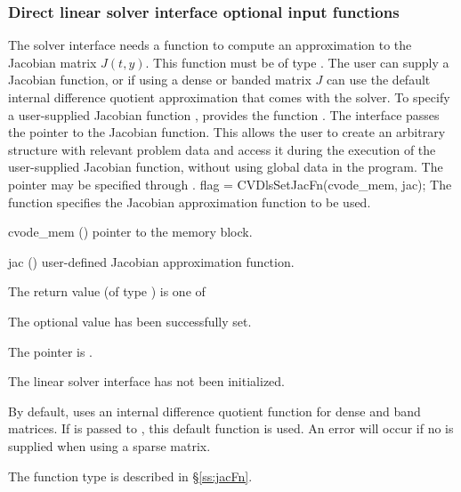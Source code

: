 \subsubsection{Direct linear solver interface optional input functions}
\label{sss:optin_dls}
The 
{\cvdls} solver interface needs a function to compute an approximation to
the Jacobian matrix $J(t,y)$.  This function must be of type .
The user can supply a Jacobian function, or if using a
dense or banded matrix $J$ can use the default internal difference
quotient approximation
that comes with the {\cvdls} solver.
To specify a user-supplied Jacobian function , {\cvdls} provides
the function .
The {\cvdls} interface passes the pointer 
to the Jacobian function. This allows the user to
create an arbitrary structure with relevant problem data and access it
during the execution of the user-supplied Jacobian function, without
using global data in the program.
The pointer  may be specified through .
{
  flag = CVDlsSetJacFn(cvode\_mem, jac);
}
{
  The function  specifies the Jacobian
  approximation function to be used.
}
{
  \begin{args}
  \item[cvode\_mem] ()
    pointer to the {\cvode} memory block.
  \item[jac] ()
    user-defined Jacobian approximation function.
  \end{args}
}
{
  The return value  (of type ) is one of
  \begin{args}
  \item[\Id{CVDLS\_SUCCESS}]
    The optional value has been successfully set.
  \item[\Id{CVDLS\_MEM\_NULL}]
    The  pointer is .
  \item[\Id{CVDLS\_LMEM\_NULL}]
    The {\cvdls} linear solver interface has not been initialized.
  \end{args}
}
{
  By default, {\cvdls} uses an internal difference quotient function
  for dense and band matrices.  If  is passed to ,
  this default function is used.  An error will occur if no 
  is supplied when using a sparse matrix.

  The function type  is described in \S\ref{ss:jacFn}.
}


